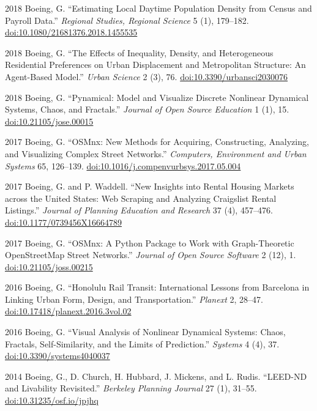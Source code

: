 \documentclass[12pt,letterpaper]{report}
\begin{document}
\begin{tablist}
        \item[2018] \tab Boeing, G. \enquote{Estimating Local Daytime Population Density from Census and Payroll Data.} \textit{Regional Studies, Regional Science} 5 (1), 179--182. \href{https://doi.org/10.1080/21681376.2018.1455535}{doi:10.1080/21681376.2018.1455535}

        \item[2018] \tab Boeing, G. \enquote{The Effects of Inequality, Density, and Heterogeneous Residential Preferences on Urban Displacement and Metropolitan Structure: An Agent-Based Model.} \textit{Urban Science} 2 (3), 76. \href{https://doi.org/10.3390/urbansci2030076}{doi:10.3390/urbansci2030076}

        \item[2018] \tab Boeing, G. \enquote{Pynamical: Model and Visualize Discrete Nonlinear Dynamical Systems, Chaos, and Fractals.} \textit{Journal of Open Source Education} 1 (1), 15. \href{https://doi.org/10.21105/jose.00015}{doi:10.21105/jose.00015}

        \item[2017] \tab Boeing, G. \enquote{OSMnx: New Methods for Acquiring, Constructing, Analyzing, and Visualizing Complex Street Networks.} \textit{Computers, Environment and Urban Systems} 65, 126--139. \href{https://doi.org/10.1016/j.compenvurbsys.2017.05.004}{doi:10.1016/j.compenvurbsys.2017.05.004}

        \item[2017] \tab Boeing, G. and P. Waddell. \enquote{New Insights into Rental Housing Markets across the United States: Web Scraping and Analyzing Craigslist Rental Listings.} \textit{Journal of Planning Education and Research} 37 (4), 457--476. \href{https://doi.org/10.1177/0739456X16664789}{doi:10.1177/0739456X16664789}

        \item[2017] \tab Boeing, G. \enquote{OSMnx: A Python Package to Work with Graph-Theoretic OpenStreetMap Street Networks.} \textit{Journal of Open Source Software} 2 (12), 1. \href{https://doi.org/10.21105/joss.00215}{doi:10.21105/joss.00215}

        \item[2016] \tab Boeing, G. \enquote{Honolulu Rail Transit: International Lessons from Barcelona in Linking Urban Form, Design, and Transportation.} \textit{Planext} 2, 28--47. \href{https://doi.org/10.17418/planext.2016.3vol.02}{doi:10.17418/planext.2016.3vol.02}

        \item[2016] \tab Boeing, G. \enquote{Visual Analysis of Nonlinear Dynamical Systems: Chaos, Fractals, Self-Similarity, and the Limits of Prediction.} \textit{Systems} 4 (4), 37. \href{https://doi.org/10.3390/systems4040037}{doi:10.3390/systems4040037}

        \item[2014] \tab Boeing, G., D. Church, H. Hubbard, J. Mickens, and L. Rudis. \enquote{LEED-ND and Livability Revisited.} \textit{Berkeley Planning Journal} 27 (1), 31--55. \href{https://doi.org/10.31235/osf.io/jpjhq}{doi:10.31235/osf.io/jpjhq}

    \end{tablist}
\end{document}
